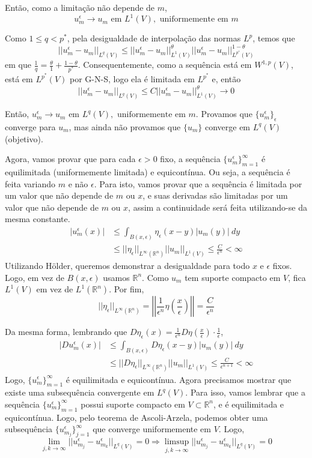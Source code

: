 \documentclass[11pt]{article}
\newcommand{\Rn}{{\mathbb{R}^n}}
\newcommand{\rn}{{\mathbb{R}^n}}
\newcommand{\e}{\epsilon}
\begin{document}
Então, como a limitação não depende de $m$, \[ u_m^\e  \rightarrow u_m \text{ em } L^1(V), \text{ uniformemente em } m  \] 

Como $1 \leq q < p^*$, pela desigualdade de interpolação das normas $L^p$, temos que \[ ||u^\e_m - u_m||_{L^q(V)} \leq ||u^\e_m - u_m||^\theta_{L^1(V)} ||u^\e_m - u_m||^{1-\theta}_{L^{p^*}(V)} \] em que $ \frac{1}{q} = \frac{\theta}{1} + \frac{1-\theta}{p^*} $. Consequentemente, como a sequência está em $W^{1,p}(V)$, está em $L^{p^*}(V)$ por G-N-S, logo ela é limitada em $L^{p^*}$ e, então \[ ||u^\e_m - u_m||_{L^q(V)} \leq C ||u^\e_m - u_m||_{L^1(V)}^\theta \rightarrow 0 \]

Então, \( u_m^\e \rightarrow u_m \text{ em } L^q(V), \text{ uniformemente em } m\). Provamos que $\{u_m^\e\}_\e$ converge para $u_m$, mas ainda não provamos que $\{u_m\}$ converge em $L^q(V)$ (objetivo).

Agora, vamos provar que para cada $\e>0$ fixo, a sequência $\{u_m^\e\}_{m=1}^\infty$ é equilimitada (uniformemente limitada) e equicontínua. Ou seja, a sequência é feita variando $m$ e não $\e$. Para isto, vamos provar que a sequência é limitada por um valor que não depende de $m$ ou $x$, e suas derivadas são limitadas por um valor que não depende de $m$ ou $x$, assim a continuidade será feita utilizando-se da mesma constante.
\begin{align*}
	|u_m^\e(x)| &\leq \int_{B(x,\e)} \eta_\e(x-y)| u_m(y) |\ dy\\
	&\leq ||\eta_\e||_{ L^\infty(\Rn)} ||u_m||_{L^1(V) } \leq \frac{C}{\e^n} < \infty
\end{align*}
Utilizando Hölder, queremos demonstrar a desigualdade para todo $x$ e $\e$ fixos. Logo, em vez de $B(x,\e)$ usamos $\rn$. Como $u_m$ tem suporte compacto em $V$, fica $L^1(V)$ em vez de $L^1(\rn)$. Por fim, \[ ||\eta_\e||_{L^\infty(\rn)} =\left|\left|\frac{1}{\e^n} \eta\left(\frac{x}{\e}\right)\right|\right| = \frac{C}{\e^n} \] 

Da mesma forma, lembrando que $D\eta_\e(x) = \frac{1}{\e^n} D\eta(\frac{x}{\e}) \cdot \frac{1}{\e}$, 
\begin{align*}
	|Du_m^\e(x)| &\leq \int_{B(x,\e)} D\eta_\e(x-y)| u_m(y) |\ dy\\
	&\leq ||D\eta_\e||_{ L^\infty(\Rn)} ||u_m||_{L^1(V) } \leq \frac{C}{\e^{n+1}} < \infty 
\end{align*}
Logo, $\{u_m^\e\}_{m=1}^\infty$ é equilimitada e equicontínua. Agora precisamos mostrar que existe uma subsequência convergente em $L^q(V)$. Para isso, vamos lembrar que a sequência $\{u_m^\e\}_{m=1}^\infty$ possui suporte compacto em $V \subset \rn$, e é equilimitada e equicontínua. Logo, pelo teorema de Ascoli-Arzela, podemos obter uma subsequência $\{u_{m_j}^\e\}_{j=1}^\infty$ que converge uniformemente em $V$. Logo, \[
\lim_{j,k\rightarrow\infty} || u_{m_j}^\e - u_{m_k}^\e ||_{L^q(V)} = 0 \Rightarrow 	\limsup_{j,k\rightarrow\infty} || u_{m_j}^\e - u_{m_k}^\e ||_{L^q(V)} = 0 
\]
\end{document}
